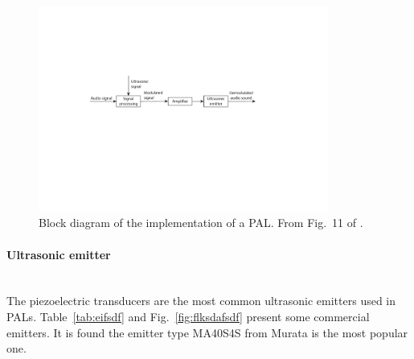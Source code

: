 \begin{figure}[htb]
    \centering
    \includegraphics[width = 0.85\textwidth]{fig/Gan2012_PAL_block_diagram/Gan2012_PAL_block_diagram.pdf}
    \caption{Block diagram of the implementation of a PAL. From Fig.~11 of \cite{Gan2012ReviewParametricAcoustic}.}
    \label{fig:Gan2012AA:block_diagram}
\end{figure}
\paragraph{Ultrasonic emitter}\mbox{}\\
The piezoelectric transducers are the most common ultrasonic emitters used in PALs. 
Table~\ref{tab:eifsdf} and Fig.~\ref{fig:flksdafsdf} present some commercial emitters.
It is found the emitter type MA40S4S from Murata is the most popular one.

